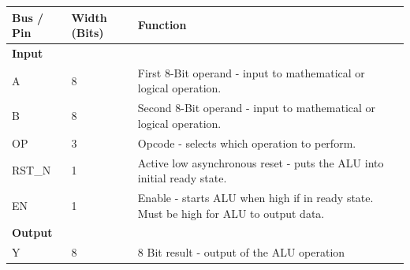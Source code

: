 \documentclass[12pt,letterpaper]{article}
\begin{document}
\begin{table}[h]
\setlength{\extrarowheight}{4pt}
\centering
\begin{tabular}{lll}
\hline
\multicolumn{1}{|l|}{\textbf{Bus / Pin}} & \multicolumn{1}{l|}{\textbf{Width (Bits)}} & \multicolumn{1}{p{10cm}|}{\textbf{Function}}                                                                                                                    \\ \hline
\textbf{Input}                           &                                            &                                                                                                                                                \\ \hline
\multicolumn{1}{|l|}{A}                  & \multicolumn{1}{l|}{8}                     & \multicolumn{1}{p{10cm}|}{First 8-Bit operand - input to mathematical or logical operation.}                                                                    \\ \hline
\multicolumn{1}{|l|}{B}                  & \multicolumn{1}{l|}{8}                     & \multicolumn{1}{p{10cm}|}{Second 8-Bit operand - input to mathematical or logical operation.}                                                                   \\ \hline
\multicolumn{1}{|l|}{OP}                 & \multicolumn{1}{l|}{3}                     & \multicolumn{1}{p{10cm}|}{Opcode - selects which operation to perform.}                                                                                         \\ \hline
\multicolumn{1}{|l|}{RST\_N}             & \multicolumn{1}{l|}{1}                     & \multicolumn{1}{p{10cm}|}{Active low asynchronous reset - puts the ALU into initial ready state.}                                                               \\ \hline
\multicolumn{1}{|l|}{EN}                 & \multicolumn{1}{l|}{1}                     & \multicolumn{1}{p{10cm}|}{Enable - starts ALU when high if in ready state. Must be high for ALU to output data.}                                                             \\ \hline
\textbf{Output}                          &                                            &                                                                                                                                                      \\ \hline
\multicolumn{1}{|l|}{Y}                  & \multicolumn{1}{l|}{8}                     & \multicolumn{1}{p{10cm}|}{8 Bit result - output of the ALU operation}                                                                                           \\ \hline

\end{tabular}
\end{table}
\end{document}
